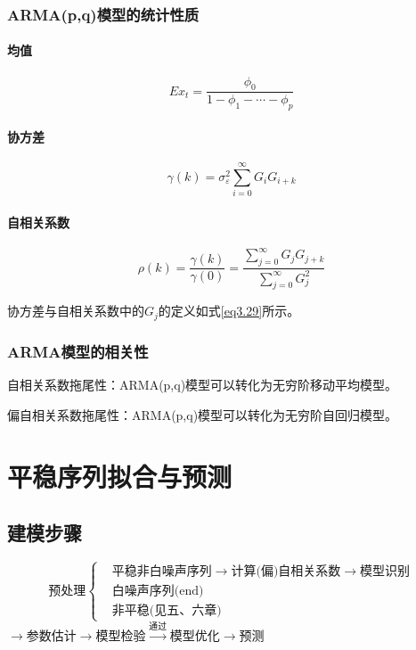 \documentclass[12pt, a4paper, oneside]{ctexbook}
\begin{document}
\subsection{ARMA(p,q)模型的统计性质}
\subsubsection{均值}
\begin{equation}
    Ex_t=\frac{\phi_0}{1-\phi_1-\cdots-\phi_p}
\end{equation}

\subsubsection{协方差}
\begin{equation}
    \gamma(k)=\sigma_\varepsilon^2\sum_{i=0}^\infty G_iG_{i+k}
\end{equation}

\subsubsection{自相关系数}
\begin{equation}
    \rho(k)=\frac{\gamma(k)}{\gamma(0)}=\frac{\sum_{j=0}^\infty G_jG_{j+k}}{\sum_{j=0}^\infty G_j^2}
\end{equation}

协方差与自相关系数中的$G_j$的定义如式\ref{eq3.29}所示。

\subsection{ARMA模型的相关性}
自相关系数拖尾性：ARMA(p,q)模型可以转化为无穷阶移动平均模型。

偏自相关系数拖尾性：ARMA(p,q)模型可以转化为无穷阶自回归模型。

\chapter{平稳序列拟合与预测}
\section{建模步骤}
\begin{equation*}
    \text{预处理}
    \left\{
    \begin{aligned}
         & \text{平稳非白噪声序列}\rightarrow \text{计算(偏)自相关系数} \rightarrow \text{模型识别} \\
         & \text{白噪声序列(end)}                                                    \\
         & \text{非平稳(见五、六章)}
    \end{aligned}
    \right.
\end{equation*}
$\rightarrow \text{参数估计} \rightarrow \text{模型检验} \xrightarrow{\text{通过}}
    \text{模型优化} \rightarrow \text{预测}$
\end{document}
